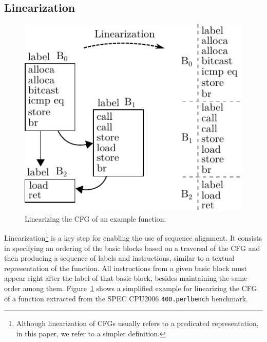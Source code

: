 \subsection{Linearization}

\begin{figure}[t!]
  \centering
  \includegraphics[width=0.7\linewidth]{figs/linearization-example.pdf}
  \caption{Linearizing the CFG of an example function.}
  \label{fig:linearization-example}
\end{figure}

Linearization\footnote{Although linearization of CFGs
usually refers to a predicated representation, %
in this paper, we refer to a simpler definition.} is a key step for enabling the use of sequence alignment. It consists in specifying an
ordering of the basic blocks based on a traversal of the CFG and then producing a sequence of labels and instructions, similar to a textual
representation of the function. All instructions from a given basic block must appear right after the label of that basic block, besides
maintaining the same order among them. Figure~\ref{fig:linearization-example} shows a simplified example for linearizing the CFG of a
function extracted from the SPEC CPU2006 \texttt{400.perlbench} benchmark.



